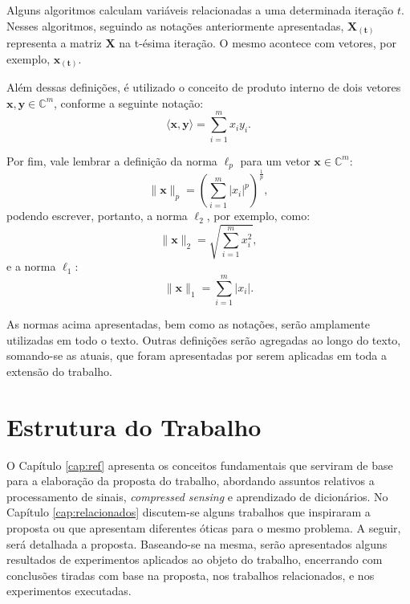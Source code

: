 \documentclass[cic,tc]{iiufrgs}
\renewcommand{\vec}[1]{\bm{#1}}
\newcommand{\mat}[1]{\bm{#1}}
\begin{document}
Alguns algoritmos calculam variáveis relacionadas a uma determinada iteração $t$.
Nesses algoritmos, seguindo as notações anteriormente apresentadas, $\mat{X_{(t)}}$ 
representa a matriz $\mat{X}$ na t-ésima iteração.
O mesmo acontece com vetores, por exemplo, $\vec{x_{(t)}}$.

Além dessas definições, é utilizado o conceito de produto interno 
de dois vetores $\vec{x}, \vec{y} \in \mathbb{C}^m$, 
conforme a seguinte notação:
\begin{equation*}
    \langle \vec{x}, \vec{y} \rangle = \sum_{i=1}^m {x_i y_i}.
\end{equation*}

Por fim, vale lembrar a definição da norma $\ell_p$ para um vetor $\vec{x} \in \mathbb{C}^m$:
\begin{equation*}
    \lVert \vec{x} \rVert_p = 
    \left( \sum_{i=1}^m {|x_i|^p} \right)^{\frac{1}{p}}, 
\end{equation*}
podendo escrever, portanto, a norma $\ell_2$, por exemplo, como:
\begin{equation*}
    \lVert \vec{x} \rVert_2 = 
    \sqrt{\sum_{i=1}^m {x_i^2}},
\end{equation*}
e a norma $\ell_1$:
\begin{equation*}
    \lVert \vec{x} \rVert_1 = 
    \sum_{i=1}^m {|x_i|}.
\end{equation*}

As normas acima apresentadas, bem como as notações, serão amplamente utilizadas
em todo o texto. 
Outras definições serão agregadas ao longo do texto, somando-se as atuais, 
que foram apresentadas por serem aplicadas em toda a extensão do trabalho.

\section{Estrutura do Trabalho}
O Capítulo \ref{cap:ref} apresenta os conceitos fundamentais que serviram de base
para a elaboração da proposta do trabalho,
abordando assuntos relativos a processamento de sinais, \emph{compressed sensing} e 
aprendizado de dicionários.
No Capítulo \ref{cap:relacionados} discutem-se alguns trabalhos que inspiraram a 
proposta ou que apresentam diferentes óticas para o mesmo problema.
A seguir, será detalhada a proposta. 
Baseando-se na mesma, serão apresentados alguns resultados de experimentos 
aplicados ao objeto do trabalho, encerrando com conclusões tiradas com 
base na proposta, nos trabalhos relacionados, e nos experimentos executadas.
\end{document}
